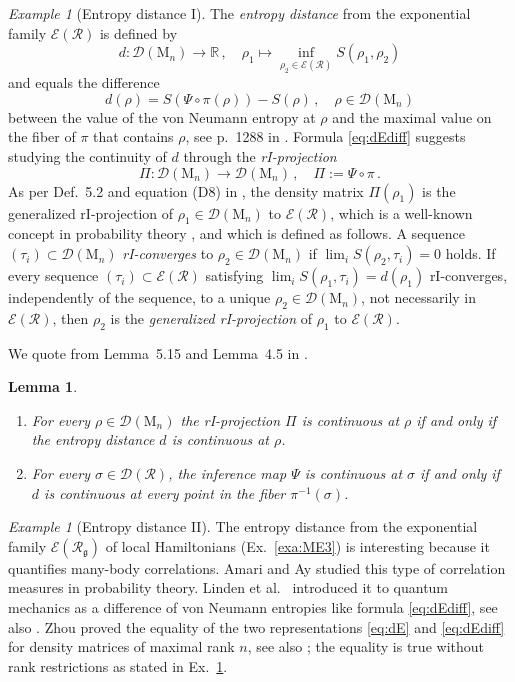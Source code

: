 \documentclass[a4paper,11pt,reqno]{amsart}
\newcommand{\R}{\mathbb{R}}
\newcommand{\M}{\mathrm{M}}
\newcommand{\cD}{\mathcal{D}}
\newcommand{\cE}{\mathcal{E}}
\newcommand{\cR}{\mathcal{R}}
\newcommand{\fg}{\mathfrak{g}}
\newtheorem{lem}[thm]{Lemma}
\theoremstyle{definition}
\theoremstyle{remark}
\newtheorem{exa}[thm]{Example}
\numberwithin{equation}{section}
\begin{document}
\begin{exa}[Entropy distance I]\label{exa:dE1}%
The \emph{entropy distance} from the exponential family $\cE(\cR)$ is 
defined by
\begin{equation}\label{eq:dE}\textstyle
d:\cD(\M_n)\to\R\,,
\quad
\rho_1\mapsto\inf_{\rho_2\in\cE(\cR)}S(\rho_1,\rho_2)
\end{equation}
and equals the difference
\begin{equation}\label{eq:dEdiff}\textstyle
d(\rho)=S(\Psi\circ\pi(\rho))-S(\rho)\,,
\quad
\rho\in\cD(\M_n)
\end{equation}
between the value of the von Neumann entropy at $\rho$ and the maximal value 
on the fiber of $\pi$ that contains $\rho$, see p.~1288 in \cite{Weis2014}. 
Formula \eqref{eq:dEdiff} suggests studying the continuity of $d$ through 
the \emph{rI-projection} 
\[\textstyle
\Pi:\cD(\M_n)\to\cD(\M_n)\,,
\quad
\Pi:=\Psi\circ\pi\,.
\]
As per Def.~5.2 and equation (D8) in \cite{Weis2014}, the density matrix 
$\Pi(\rho_1)$ is the generalized rI-projection of 
$\rho_1\in\cD(\M_n)$ to $\cE(\cR)$, which is a well-known concept in 
probability theory \cite{CsiszarMatus2003}, and which is defined as follows. 
A sequence $(\tau_i)\subset\cD(\M_n)$ \emph{rI-converges} to 
$\rho_2\in\cD(\M_n)$ if $\lim_iS(\rho_2,\tau_i)=0$ holds. If every sequence 
$(\tau_i)\subset\cE(\cR)$ satisfying $\lim_iS(\rho_1,\tau_i)=d(\rho_1)$ 
rI-converges, independently of the sequence, to a unique $\rho_2\in\cD(\M_n)$, 
not necessarily in $\cE(\cR)$, then $\rho_2$ is the 
\emph{generalized rI-projection} of $\rho_1$ to $\cE(\cR)$.
\end{exa}
%
We quote from Lemma~5.15 and Lemma~4.5 in \cite{Weis2014}.
\par
%
\begin{lem}\label{lem:dEcont}~
\begin{enumerate}
\item[a)] For every $\rho\in\cD(\M_n)$ the rI-projection $\Pi$ is continuous 
at $\rho$ if and only if the entropy distance $d$ is continuous at $\rho$.
\item[b)] For every $\sigma\in\cD(\cR)$, the inference map $\Psi$ is continuous 
at $\sigma$ if and only if $d$ is continuous at every point in the fiber 
$\pi^{-1}(\sigma)$.
\end{enumerate}
\end{lem}
%
\begin{exa}[Entropy distance II]\label{exa:dE2}%
The entropy distance from the exponential family $\cE(\cR_\fg)$ of local 
Hamiltonians (Ex.~\ref{exa:ME3}) is interesting because it quantifies many-body 
correlations. Amari \cite{Amari2001} and Ay \cite{Ay2002} studied this type of 
correlation measures in probability theory. Linden et al.~\cite{Linden-etal2002} 
introduced it to quantum mechanics as a difference of von Neumann entropies like 
formula \eqref{eq:dEdiff}, see also \cite[Sec.~1.4.2]{Zeng-etal2019}. Zhou 
\cite{Zhou2009} proved the equality of the two representations \eqref{eq:dE} 
and \eqref{eq:dEdiff} for density matrices of maximal rank $n$, see also 
\cite{Niekamp-etal2013}; the equality is true without rank restrictions as 
stated in Ex.~\ref{exa:dE1}.
\end{exa}
\end{document}

